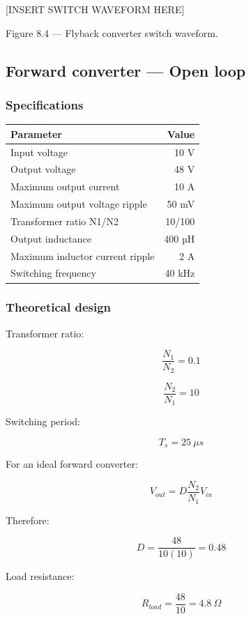 \documentclass[
  paper=a4,
  oneside  ,captions=tableheading
]{scrartcl}
\newcounter{none}
\begin{document}
{[}INSERT SWITCH WAVEFORM HERE{]}

Figure 8.4 --- Flyback converter switch waveform.

\subsection{Forward converter --- Open
loop}\label{forward-converter-open-loop}

\subsubsection{Specifications}\label{specifications-3}

{\def\LTcaptype{none} %
\begin{longtable}[]{@{}lr@{}}
\toprule\noalign{}
Parameter & Value \\
\midrule\noalign{}
\endhead
\bottomrule\noalign{}
\endlastfoot
Input voltage & 10 V \\
Output voltage & 48 V \\
Maximum output current & 10 A \\
Maximum output voltage ripple & 50 mV \\
Transformer ratio N1/N2 & 10/100 \\
Output inductance & 400 µH \\
Maximum inductor current ripple & 2 A \\
Switching frequency & 40 kHz \\
\end{longtable}
}

\subsubsection{Theoretical design}\label{theoretical-design-4}

Transformer ratio:

\[
\frac{N_1}{N_2}=0.1
\]

\[
\frac{N_2}{N_1}=10
\]

Switching period:

\[
T_s=25\ \mu s
\]

For an ideal forward converter:

\[
V_{out}
=
D
\frac{N_2}{N_1}
V_{in}
\]

Therefore:

\[
D=
\frac{48}{10(10)}
=
0.48
\]

Load resistance:

\[
R_{load}
=
\frac{48}{10}
=
4.8\ \Omega
\]
\end{document}
